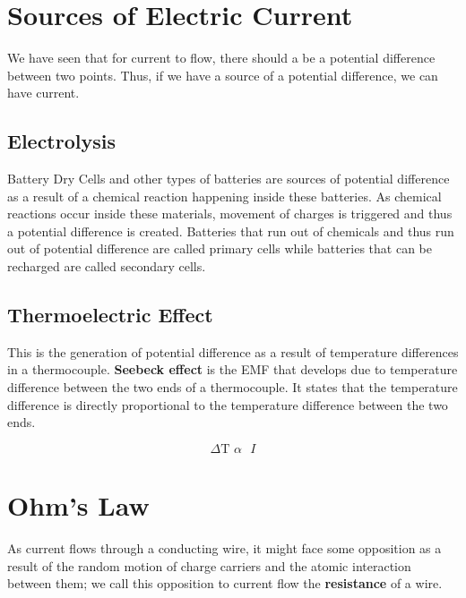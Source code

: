 \documentclass[9pt,addpoints]{exam}
\begin{document}
\section*{Sources of Electric Current}
We have seen that for current to flow, there should a be a potential difference between two points. Thus, if we have a source of a potential difference, we can have current.
\subsection*{Electrolysis}
Battery Dry Cells and other types of batteries are sources of potential difference as a result of a chemical reaction happening inside these batteries. As chemical reactions occur inside these materials, movement of charges is triggered and thus a potential difference is created. \newline
Batteries that run out of chemicals and thus run out of potential difference are called primary cells while batteries that can be recharged are called secondary cells.
\subsection*{Thermoelectric Effect}
This is the generation of potential difference as a result of temperature differences in a thermocouple. \textbf{Seebeck effect} is the EMF that develops due to temperature difference between the two ends of a thermocouple. It states that the temperature difference is directly proportional to the temperature difference between the two ends.

$$\varDelta\text{T  }\alpha\text{  }I$$

\section*{Ohm's Law}
As current flows through a conducting wire, it might face some opposition as a result of the random motion of charge carriers and the atomic interaction between them; we call this opposition to current flow the \textbf{resistance} of a wire. \newline
\end{document}
